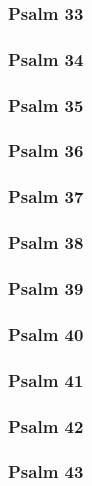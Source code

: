 \documentclass[10pt]{extarticle}
\begin{document}
\begin{multicols}{2}
\subsubsection{Psalm 33}

\newpage

\subsubsection{Psalm 34}

\newpage

\subsubsection{Psalm 35}

\newpage

\subsubsection{Psalm 36}

\newpage

\subsubsection{Psalm 37}

\newpage

\subsubsection{Psalm 38}

\newpage

\subsubsection{Psalm 39}

\newpage

\subsubsection{Psalm 40}

\newpage

\subsubsection{Psalm 41}

\newpage

\subsubsection{Psalm 42}

\newpage

\subsubsection{Psalm 43}

\newpage


\end{multicols}
\end{document}
